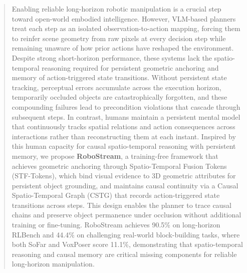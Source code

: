 \documentclass[runningheads]{llncs}
\begin{document}
\begin{abstract}
Enabling reliable long-horizon robotic manipulation is a crucial step toward open-world embodied intelligence. However, VLM-based planners treat each step as an isolated observation-to-action mapping, forcing them to reinfer scene geometry from raw pixels at every decision step while remaining unaware of how prior actions have reshaped the environment. Despite strong short-horizon performance, these systems lack the spatio-temporal reasoning required for persistent geometric anchoring and memory of action-triggered state transitions. Without persistent state tracking, perceptual errors accumulate across the execution horizon, temporarily occluded objects are catastrophically forgotten, and these compounding failures lead to precondition violations that cascade through subsequent steps. In contrast, humans maintain a persistent mental model that continuously tracks spatial relations and action consequences across interactions rather than reconstructing them at each instant.
Inspired by this human capacity for causal spatio-temporal reasoning with persistent memory, we propose \textbf{RoboStream}, a training-free framework that achieves geometric anchoring through Spatio-Temporal Fusion Tokens (STF-Tokens), which bind visual evidence to 3D geometric attributes for persistent object grounding, and maintains causal continuity via a Causal Spatio-Temporal Graph (CSTG) that records action-triggered state transitions across steps. This design enables the planner to trace causal chains and preserve object permanence under occlusion without additional training or fine-tuning. RoboStream achieves 90.5\% on long-horizon RLBench and 44.4\% on challenging real-world block-building tasks, where both SoFar and VoxPoser score 11.1\%, demonstrating that spatio-temporal reasoning and causal memory are critical missing components for reliable long-horizon manipulation.








\end{abstract}
    

% 
% 
% 
% 
% 
% 

% 
% 


\clearpage
\appendix

\end{document}
